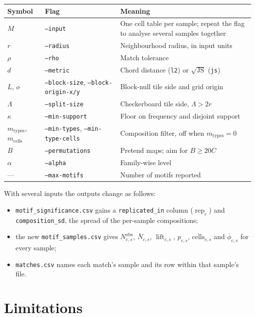 \documentclass[11pt,a4paper]{article}
\theoremstyle{remark}
\newcommand{\obs}{\mathrm{obs}}
\newcommand{\lift}{\operatorname{lift}}
\newcommand{\rep}{\operatorname{rep}}
\newcommand{\JS}{\operatorname{JS}}
\newcommand{\mtypes}{m_{\mathrm{types}}}
\newcommand{\mcells}{m_{\mathrm{cells}}}
\begin{document}
\begin{center}
\small
\begin{tabular}{llp{6.4cm}}
\toprule
Symbol & Flag & Meaning \\
\midrule
$M$ & \texttt{--input} & One cell table per sample; repeat the flag to analyse several samples together \\
$r$ & \texttt{--radius} & Neighbourhood radius, in input units \\
$\rho$ & \texttt{--rho} & Match tolerance \\
$d$ & \texttt{--metric} & Chord distance (\texttt{l2}) or $\sqrt{\JS}$ (\texttt{js}) \\
$L$, $o$ & \texttt{--block-size}, \texttt{--block-origin-x/y} & Block-null tile side and grid origin \\
$\Lambda$ & \texttt{--split-size} & Checkerboard tile side, $\Lambda>2r$ \\
$\kappa$ & \texttt{--min-support} & Floor on frequency and disjoint support \\
$\mtypes$, $\mcells$ & \texttt{--min-types}, \texttt{--min-type-cells} & Composition filter, off when $\mtypes=0$ \\
$B$ & \texttt{--permutations} & Pretend maps; aim for $B\ge20C$ \\
$\alpha$ & \texttt{--alpha} & Family-wise level \\
--- & \texttt{--max-motifs} & Number of motifs reported \\
\bottomrule
\end{tabular}
\end{center}

With several inputs the outputs change as follows:
\begin{itemize}[itemsep=1pt]
  \item \texttt{motif\_significance.csv} gains a \texttt{replicated\_in} column
        ($\rep_c$) and \texttt{composition\_sd}, the spread of the per-sample
        compositions;
  \item the new \texttt{motif\_samples.csv} gives $N^{\obs}_{c,s}$,
        $\bar N_{c,s}$, $\lift_{c,s}$, $p_{c,s}$, $\overline{\mathrm{cells}}_{c,s}$
        and $\overline\phi_{c,s}$ for every sample;
  \item \texttt{matches.csv} names each match's sample and its row within that
        sample's file.
\end{itemize}

\section{Limitations}
\label{sec:limits}
\end{document}
